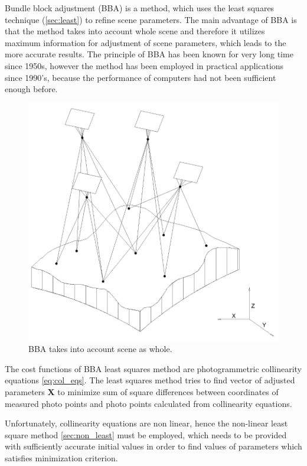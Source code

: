 \documentclass[a4paper,12pt]{article}
\newcommand{\evect}[1]{
{\bf #1}
}
\begin{document}
Bundle block adjustment (BBA) is a method, which uses the least squares technique (\ref{sec:least}) to refine scene parameters. 
The main advantage of BBA is that the method takes into account whole scene and therefore it utilizes 
maximum information for adjustment of scene parameters, which leads to the more accurate results.
The principle of BBA has been known for very long time since 1950s,
however the method has been employed in practical applications since 1990's, because the performance of computers had not been 
sufficient enough before. 


\begin{figure}[h]
    \centering
    \includegraphics[scale=0.3]{figures/bba.png}
    \caption{BBA takes into account scene as whole.}
    \label{fig:rel_or_amb}
\end{figure}

The cost functions of BBA least squares method are photogrammetric collinearity equations \eqref{eq:col_eqs}.
The least squares method tries to find vector of adjusted parameters \evect{X} to minimize
sum  of square differences between coordinates of measured photo points and photo points calculated 
from collinearity equations.

Unfortunately, collinearity equations are non linear, hence the non-linear least square method \ref{sec:non_least} must be employed, which 
needs to be provided  with sufficiently accurate initial values in order to find values of parameters which satisfies minimization criterion.
\end{document}
